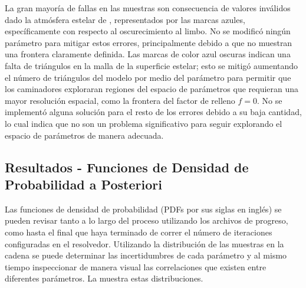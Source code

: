 La gran mayoría de fallas en las muestras son consecuencia de valores inválidos
dado la atmósfera estelar de
, representados por
las marcas azules, específicamente con respecto al oscurecimiento al limbo. No
se modificó ningún parámetro para mitigar estos errores, principalmente debido a
que no muestran una frontera claramente definida. Las marcas de color azul
oscuras indican una falta de triángulos en la malla de la superficie estelar;
esto se mitigó aumentando el número de triángulos del modelo por medio del
parámetro  para permitir que los caminadores exploraran
regiones del espacio de parámetros que requieran una mayor resolución espacial,
como la frontera del factor de relleno $f = 0$. No se implementó alguna solución
para el resto de los errores debido a su baja cantidad, lo cual indica que no
son un problema significativo para seguir explorando el espacio de parámetros de
manera adecuada. 

\subsection{Resultados - Funciones de Densidad de Probabilidad a Posteriori} \label{metodologia:modelocomputacional:mcmc:resultados}

Las funciones de densidad de probabilidad (PDFs por sus siglas en inglés) se
pueden revisar tanto a lo largo del proceso utilizando los archivos de progreso,
como hasta el final que haya terminado de correr el número de iteraciones
configuradas en el resolvedor. Utilizando la distribución de las muestras en la
cadena se puede determinar las incertidumbres de cada parámetro y al mismo
tiempo inspeccionar de manera visual las correlaciones que existen entre
diferentes parámetros. La  muestra
estas distribuciones.

